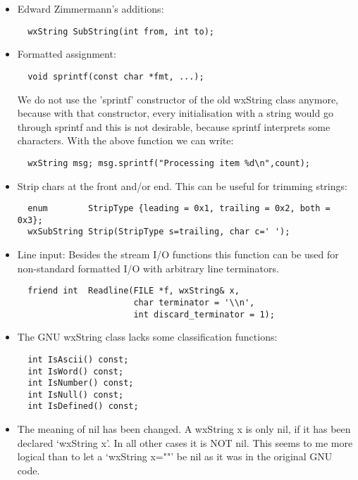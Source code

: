 \begin{itemize}
\item Edward Zimmermann's additions:
\begin{verbatim}
  wxString SubString(int from, int to);
\end{verbatim}

\item Formatted assignment:
\begin{verbatim}
  void sprintf(const char *fmt, ...);
\end{verbatim}

We do not use the 'sprintf' constructor of the old wxString class anymore, 
because with that constructor, every initialisation with a string would 
go through sprintf and this is not desirable, because sprintf interprets
some characters. With the above function we can write:

\begin{verbatim}
  wxString msg; msg.sprintf("Processing item %d\n",count);
\end{verbatim}
  
\item Strip chars at the front and/or end.
This can be useful for trimming strings:
\begin{verbatim}
  enum        StripType {leading = 0x1, trailing = 0x2, both = 0x3};
  wxSubString Strip(StripType s=trailing, char c=' ');
\end{verbatim}
  
\item Line input:  
Besides the stream I/O functions this function can be used for non-standard
formatted I/O with arbitrary line terminators.                            
\begin{verbatim}
  friend int  Readline(FILE *f, wxString& x, 
                       char terminator = '\\n',
                       int discard_terminator = 1);
\end{verbatim}

\item The GNU wxString class lacks some classification functions:
\begin{verbatim}
  int IsAscii() const;
  int IsWord() const;
  int IsNumber() const;
  int IsNull() const;
  int IsDefined() const;
\end{verbatim}

\item The meaning of nil has been changed. A wxString x is only nil, if it
has been declared `wxString x'. In all other cases it is NOT nil. This
seems to me more logical than to let a `wxString x=""' be nil as it
was in the original GNU code.


\end{itemize}
